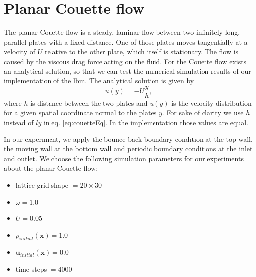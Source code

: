 \documentclass[a4paper,11pt, footsepline]{book}
\begin{document}
\section{Planar Couette flow}\label{sec-Couette}
The planar Couette flow is a steady, laminar flow between two infinitely long, parallel plates with a fixed distance. One of those plates moves tangentially at a velocity of $U$ relative to the other plate, which itself is stationary. The flow is caused by the viscous drag force acting on the fluid. For the Couette flow exists an analytical solution, so that we can test the numerical simulation results of our implementation of the \ac{lbm}. The analytical solution is given by
\begin{equation}
\label{eq:couetteEq}
u(y)=-U\frac{y}{h},
\end{equation}
where $h$ is distance between the two plates and $u(y)$ is the velocity distribution for a given spatial coordinate normal to the plates $y$. For sake of clarity we use $h$ instead of $ly$ in eq. \ref{eq:couetteEq}. In the implementation those values are equal.

In our experiment, we apply the bounce-back boundary condition at the top wall, the moving wall at the bottom wall and periodic boundary conditions at the inlet and outlet. We choose the following simulation parameters for our experiments about the planar Couette flow:
\begin{itemize}
\setlength\itemsep{0.15em}
\item lattice grid shape $=20\times 30$
\item $\omega=1.0$
\item $U=0.05$
\item $\rho_{initial}(\mathbf{x})=1.0$
\item $\mathbf{u}_{initial}(\mathbf{x})=0.0$
\item time steps $=4000$
\end{itemize}
\end{document}
